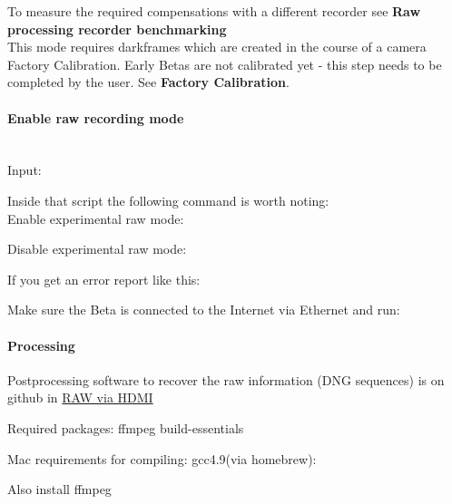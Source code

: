 To measure the required compensations with a different recorder see \textbf{Raw processing recorder benchmarking}\\

This mode requires darkframes which are created in the course of a camera Factory Calibration. Early Betas are not calibrated yet - this step needs to be completed by the user. See \textbf{Factory Calibration}.\\

\paragraph{Enable raw recording mode}\mbox{}\\

Input:


Inside that script the following command is worth noting:\\

Enable experimental raw mode: 


Disable experimental raw mode: 


If you get an error report like this: 


Make sure the Beta is connected to the Internet via Ethernet and run:     




\paragraph{Processing}

Postprocessing software to recover the raw information (DNG sequences) is on github in \href{https://github.com/apertus-open-source-cinema/misc-tools-utilities/tree/master/raw-via-hdmi}{RAW via HDMI}

Required packages: ffmpeg build-essentials

Mac requirements for compiling: gcc4.9(via homebrew): 


Also install ffmpeg\\

